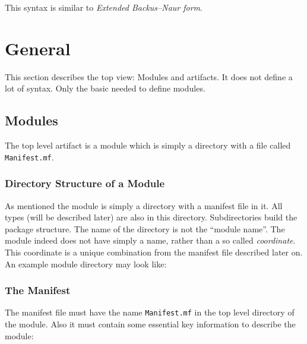 \documentclass[11pt,a4paper]{report}
\begin{document}
\noindent This syntax is similar to \textit{Extended Backus–Naur form}\cite{ebnf-wiki}.

\chapter{General}

This section describes the top view: Modules and artifacts. It does not define a lot of syntax. Only the basic needed to define modules.

\section{Modules}

The top level artifact is a module which is simply a directory with a file called \texttt{Manifest.mf}.

\subsection{Directory Structure of a Module}

As mentioned the module is simply a directory with a manifest file in it. All types (will be described later) are also in this directory. Subdirectories build the package structure. The name of the directory is not the ``module name''. The module indeed does not have simply a name, rather than a so called \textit{coordinate}. This coordinate is a unique combination from the manifest file described later on. An example module directory may look like:
\\

\subsection{The Manifest}

The manifest file must have the name \texttt{Manifest.mf} in the top level directory of the module. Also it must contain some essential key information to describe the module:
\end{document}
